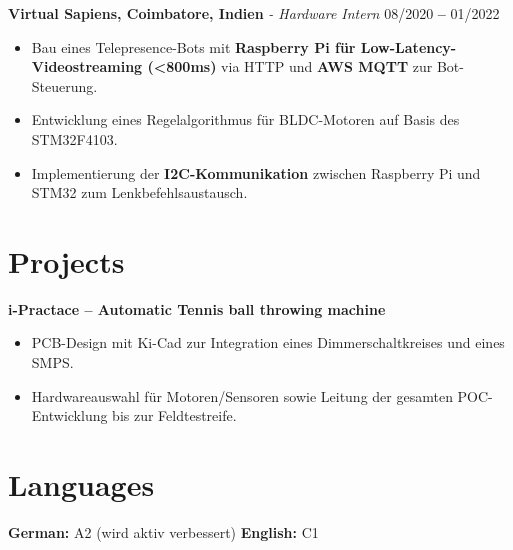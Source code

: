 \documentclass[letterpaper,11pt]{article}
\begin{document}
\vspace{8pt}
\noindent
\textbf{Virtual Sapiens, Coimbatore, Indien} \textit{- Hardware Intern} \hfill 08/2020 \textbf{--} 01/2022
\begin{itemize}[leftmargin=*]
\item Bau eines Telepresence-Bots mit \textbf{Raspberry Pi für Low-Latency-Videostreaming (<800ms)} via HTTP und \textbf{AWS MQTT} zur Bot-Steuerung.
\item Entwicklung eines Regelalgorithmus für BLDC-Motoren auf Basis des STM32F4103.
\item Implementierung der \textbf{I2C-Kommunikation} zwischen Raspberry Pi und STM32 zum Lenkbefehlsaustausch.
\end{itemize}

\section{Projects}
\textbf{i-Practace \textbf{--} Automatic Tennis ball throwing machine}
\begin{itemize}[leftmargin=*]
  \item PCB-Design mit Ki-Cad zur Integration eines Dimmerschaltkreises und eines SMPS.
  \item Hardwareauswahl für Motoren/Sensoren sowie Leitung der gesamten POC-Entwicklung bis zur Feldtestreife.
\end{itemize}


\section{Languages}
  \vspace{2pt}
  \textbf{German:} {A2 (wird aktiv verbessert)} 
  \quad
  \textbf{English:} {C1}
\end{document}
